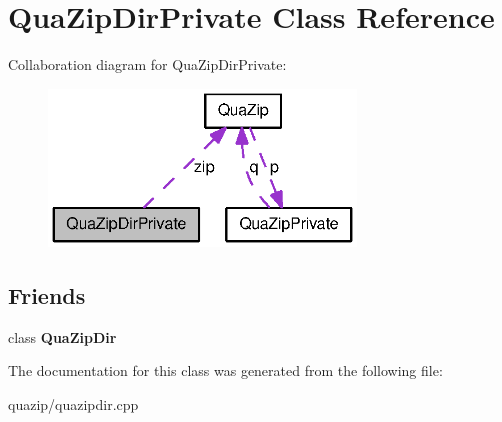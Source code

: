 \section{QuaZipDirPrivate Class Reference}
\label{classQuaZipDirPrivate}


Collaboration diagram for QuaZipDirPrivate:
\nopagebreak
\begin{figure}[H]
\begin{center}
\leavevmode
\includegraphics[width=232pt]{classQuaZipDirPrivate__coll__graph}
\end{center}
\end{figure}
\subsection*{Friends}
\begin{DoxyCompactItemize}
\item 
class {\bf QuaZipDir}\label{classQuaZipDirPrivate_a088f5b81fb035c42d2e3252d57502aef}

\end{DoxyCompactItemize}


The documentation for this class was generated from the following file:\begin{DoxyCompactItemize}
\item 
quazip/quazipdir.cpp\end{DoxyCompactItemize}
